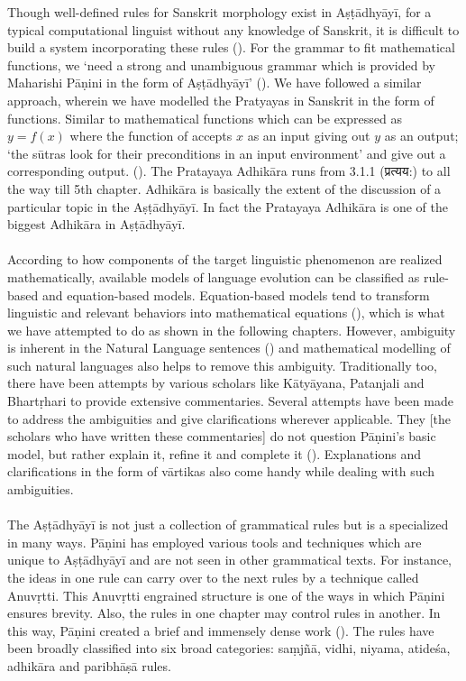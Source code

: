 Though well-defined rules for Sanskrit morphology exist in Aṣṭādhyāyī, for a typical computational linguist without any knowledge of Sanskrit, it is difficult to build a system incorporating these rules (\cite{Kulkarni2009SanskritMA}). For the grammar to fit mathematical functions, we ‘need a strong and unambiguous grammar which is provided by Maharishi Pāṇini in the form of Aṣṭādhyāyī’ (\cite{agrawal}). We have followed a similar approach, wherein we have modelled the Pratyayas in Sanskrit in the form of functions. Similar to mathematical functions which can be expressed as $y = f (x)$ where the function of accepts $x$ as an input giving out $y$ as an output; ‘the sūtras look for their preconditions in an input environment’ and give out a corresponding output. (\cite{malhar}). The Pratayaya Adhikāra runs from 3.1.1 (\texthindi{प्रत्यय:}) to all the way till 5th chapter. Adhikāra is basically the extent of the discussion of a particular topic in the Aṣṭādhyāyī. In fact the Pratayaya Adhikāra is one of the biggest Adhikāra in Aṣṭādhyāyī.\\\\
According to how components of the target linguistic phenomenon are realized mathematically, available models of language evolution can be classified as rule-based and equation-based models. Equation-based models tend to transform linguistic and relevant behaviors into mathematical equations (\cite{agrawal}), which is what we have attempted to do as shown in the following chapters. However, ambiguity is inherent in the Natural Language sentences (\cite{Tapaswi2012TreebankBD}) and mathematical modelling of such natural languages also helps to remove this ambiguity. Traditionally too, there have been attempts by various scholars like Kātyāyana, Patanjali and Bhartṛhari to provide extensive commentaries. Several attempts have been made to address the ambiguities and give clarifications wherever applicable. They [the scholars who have written these commentaries] do not question Pāṇini’s basic model, but rather explain it, refine it and complete it (\cite{huet}). Explanations and clarifications in the form of vārtikas also come handy while dealing with such ambiguities.\\\\
The Aṣṭādhyāyī is not just a collection of grammatical rules but is a specialized in many ways. Pāṇini has employed various tools and techniques which are unique to Aṣṭādhyāyī and are not seen in other grammatical texts. For instance, the ideas in one rule can carry over to the next rules by a technique called Anuvṛtti. This Anuvṛtti engrained structure is one of the ways in which Pāṇini ensures brevity. Also, the rules in one chapter may control rules in another. In this way, Pāṇini created a brief and immensely dense work (\cite{learnsanskrit}). The rules have been broadly classified into six broad categories: saṃjñā, vidhi, niyama, atideśa, adhikāra and paribhāṣā rules. \\\\
